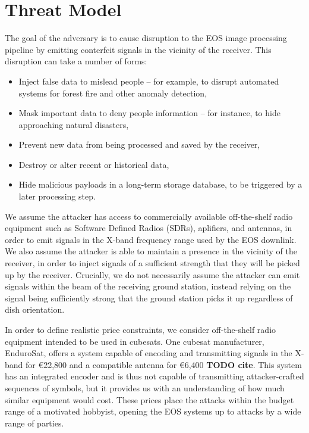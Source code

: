 \section{Threat Model}

The goal of the adversary is to cause disruption to the EOS image processing pipeline by emitting conterfeit signals in the vicinity of the receiver.
This disruption can take a number of forms:
\begin{itemize}
    \item Inject false data to mislead people -- for example, to disrupt automated systems for forest fire and other anomaly detection,
    \item Mask important data to deny people information -- for instance, to hide approaching natural disasters,
    \item Prevent new data from being processed and saved by the receiver,
    \item Destroy or alter recent or historical data,
    \item Hide malicious payloads in a long-term storage database, to be triggered by a later processing step.
\end{itemize}

We assume the attacker has access to commercially available off-the-shelf radio equipment such as Software Defined Radios (SDRs), aplifiers, and antennas, in order to emit signals in the X-band frequency range used by the EOS downlink.
We also assume the attacker is able to maintain a presence in the vicinity of the receiver, in order to inject signals of a sufficient strength that they will be picked up by the receiver.
Crucially, we do not necessarily assume the attacker can emit signals within the beam of the receiving ground station, instead relying on the signal being sufficiently strong that the ground station picks it up regardless of dish orientation.

In order to define realistic price constraints, we consider off-the-shelf radio equipment intended to be used in cubesats.
One cubesat manufacturer, EnduroSat, offers a system capable of encoding and transmitting signals in the X-band for €22,800 and a compatible antenna for €6,400 \textbf{TODO cite}.
This system has an integrated encoder and is thus not capable of transmitting attacker-crafted sequences of symbols, but it provides us with an understanding of how much similar equipment would cost.
These prices place the attacks within the budget range of a motivated hobbyist, opening the EOS systems up to attacks by a wide range of parties.

